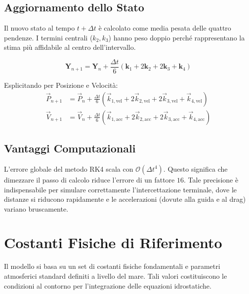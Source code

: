 \documentclass[12pt,a4paper]{article}
\begin{document}
\subsection{Aggiornamento dello Stato}
Il nuovo stato al tempo $t + \Delta t$ è calcolato come media pesata delle quattro pendenze. I termini centrali ($k_2, k_3$) hanno peso doppio perché rappresentano la stima più affidabile al centro dell'intervallo.

\begin{equation}
    \mathbf{Y}_{n+1} = \mathbf{Y}_n + \frac{\Delta t}{6} \left( \mathbf{k}_1 + 2\mathbf{k}_2 + 2\mathbf{k}_3 + \mathbf{k}_4 \right)
\end{equation}

Esplicitando per Posizione e Velocità:
\begin{align}
    \vec{P}_{n+1} &= \vec{P}_n + \frac{\Delta t}{6} (\vec{k}_{1, \text{vel}} + 2\vec{k}_{2, \text{vel}} + 2\vec{k}_{3, \text{vel}} + \vec{k}_{4, \text{vel}}) \\
    \vec{V}_{n+1} &= \vec{V}_n + \frac{\Delta t}{6} (\vec{k}_{1, \text{acc}} + 2\vec{k}_{2, \text{acc}} + 2\vec{k}_{3, \text{acc}} + \vec{k}_{4, \text{acc}})
\end{align}

\subsection{Vantaggi Computazionali}
L'errore globale del metodo RK4 scala con $\mathcal{O}(\Delta t^4)$. Questo significa che dimezzare il passo di calcolo riduce l'errore di un fattore $16$. Tale precisione è indispensabile per simulare correttamente l'intercettazione terminale, dove le distanze si riducono rapidamente e le accelerazioni (dovute alla guida e al drag) variano bruscamente.


\section{Costanti Fisiche di Riferimento}
Il modello si basa su un set di costanti fisiche fondamentali e parametri atmosferici standard definiti a livello del mare. Tali valori costituiscono le condizioni al contorno per l'integrazione delle equazioni idrostatiche.
\end{document}
